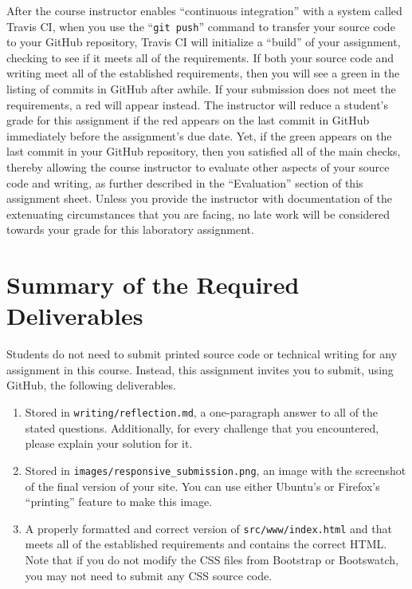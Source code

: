 \documentclass[11pt]{article}
\newcommand{\mainprogramsource}{\lstinline{src/www/index.html}}
\newcommand{\reflection}{\lstinline{writing/reflection.md}}
\newcommand{\screenshot}{\lstinline{images/responsive_submission.png}}
\newcommand{\gitpush}{\command{git push}}
\newcommand{\command}[1]{``\lstinline{#1}''}
\newcommand{\step}[1]{``{#1}''}
\newcommand{\checkmark}{\ding{51}}
\newcommand{\naughtmark}{\ding{55}}
\begin{document}
After the course instructor enables \step{continuous integration} with a system
called Travis CI, when you use the \gitpush{} command to transfer your source
code to your GitHub repository, Travis CI will initialize a \step{build} of your
assignment, checking to see if it meets all of the requirements. If both your
source code and writing meet all of the established requirements, then you will
see a green \checkmark{} in the listing of commits in GitHub after awhile. If
your submission does not meet the requirements, a red \naughtmark{} will appear
instead. The instructor will reduce a student's grade for this assignment if the
red \naughtmark{} appears on the last commit in GitHub immediately before the
assignment's due date. Yet, if the green \checkmark{} appears on the last commit
in your GitHub repository, then you satisfied all of the main checks, thereby
allowing the course instructor to evaluate other aspects of your source code and
writing, as further described in the \step{Evaluation} section of this
assignment sheet. Unless you provide the instructor with documentation of the
extenuating circumstances that you are facing, no late work will be considered
towards your grade for this laboratory assignment.

\section*{Summary of the Required Deliverables}

\noindent Students do not need to submit printed source code or technical
writing for any assignment in this course. Instead, this assignment invites you
to submit, using GitHub, the following deliverables.

\vspace*{-.1in}

\begin{enumerate}

  \setlength{\itemsep}{0in}

\item Stored in \reflection{}, a one-paragraph answer to all of the stated
  questions. Additionally, for every challenge that you encountered, please
  explain your solution for it.

\item Stored in \screenshot{}, an image with the screenshot of the final version
  of your site. You can use either Ubuntu's or Firefox's ``printing'' feature to
  make this image.

\item A properly formatted and correct version of \mainprogramsource{} and that
  meets all of the established requirements and contains the correct HTML. Note
  that if you do not modify the CSS files from Bootstrap or Bootswatch, you may
  not need to submit any CSS source code.

\end{enumerate}
\end{document}
